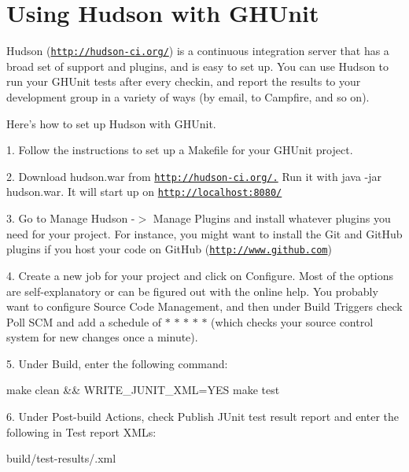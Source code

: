 \hypertarget{_hudson_Using}{}\section{\-Using Hudson with G\-H\-Unit}\label{_hudson_Using}
\-Hudson (\href{http://hudson-ci.org/}{\tt http\-://hudson-\/ci.\-org/}) is a continuous integration server that has a broad set of support and plugins, and is easy to set up. \-You can use \-Hudson to run your \-G\-H\-Unit tests after every checkin, and report the results to your development group in a variety of ways (by email, to \-Campfire, and so on).

\-Here's how to set up \-Hudson with \-G\-H\-Unit.

1. \-Follow the instructions to set up a \-Makefile for your \-G\-H\-Unit project.

2. \-Download {\ttfamily hudson.\-war} from \href{http://hudson-ci.org/.}{\tt http\-://hudson-\/ci.\-org/.} \-Run it with {\ttfamily java -\/jar hudson.\-war}. \-It will start up on \href{http://localhost:8080/}{\tt http\-://localhost\-:8080/}

3. \-Go to {\ttfamily \-Manage \-Hudson -\/$>$ \-Manage \-Plugins} and install whatever plugins you need for your project. \-For instance, you might want to install the \-Git and \-Git\-Hub plugins if you host your code on \-Git\-Hub (\href{http://www.github.com}{\tt http\-://www.\-github.\-com})

4. \-Create a new job for your project and click on {\ttfamily \-Configure}. \-Most of the options are self-\/explanatory or can be figured out with the online help. \-You probably want to configure {\ttfamily \-Source \-Code \-Management}, and then under {\ttfamily \-Build \-Triggers} check {\ttfamily \-Poll \-S\-C\-M} and add a schedule of {\ttfamily $\ast$ $\ast$ $\ast$ $\ast$ $\ast$} (which checks your source control system for new changes once a minute).

5. \-Under {\ttfamily \-Build}, enter the following command\-:

\begin{DoxyVerb}
 make clean && WRITE_JUNIT_XML=YES make test
 \end{DoxyVerb}


6. \-Under {\ttfamily \-Post-\/build \-Actions}, check {\ttfamily \-Publish \-J\-Unit test result report} and enter the following in {\ttfamily \-Test report \-X\-M\-Ls}\-:

\begin{DoxyVerb}
 build/test-results/\*.xml
 \end{DoxyVerb}


